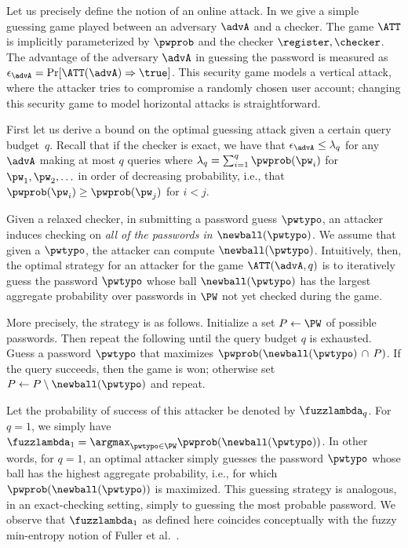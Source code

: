 Let us precisely define the notion of an online attack. In  we give a simple guessing game
played between an adversary $\advA$ and a checker. The game $\ATT$ is
implicitly parameterized by $\pwprob$ and the checker
$\register,\checker$. The advantage of the adversary $\advA$ in
guessing the password is measured as
$\epsilon_\advA = \Pr[\ATT(\advA)\Rightarrow\true]$.  This security
game models a vertical attack, where the attacker tries to compromise
a randomly chosen user account; changing this security game to model
horizontal attacks is straightforward.  

First let us derive a bound on the optimal guessing attack given a
certain query budget~$q$.  Recall that if the checker is exact, we
have that $\epsilon_\advA \le \lambda_q$ for any $\advA$ making at
most $q$ queries where $\lambda_q = \sum_{i=1}^q \pwprob(\pw_i)$ 
for $\pw_1, \pw_2, \ldots$ in order of decreasing probability, i.e.,
that $\pwprob(\pw_i) \ge \pwprob(\pw_j)$ for $i < j$.  

Given a relaxed checker, in submitting a password guess $\pwtypo$, an
attacker induces checking on {\em all of the passwords in
  $\newball(\pwtypo)$}. We assume that given a $\pwtypo$, the attacker
can compute $\newball(\pwtypo)$. Intuitively, then, the optimal
strategy for an attacker for the game $\ATT(\advA,q)$ is to
iteratively guess the password $\pwtypo$ whose ball
$\newball(\pwtypo)$ has the largest aggregate probability over
passwords in $\PW$ not yet checked during the game.

More precisely, the strategy is as follows. Initialize a set
$P \gets \PW$ of possible passwords. Then repeat the following until
the query budget $q$ is exhausted. Guess a password $\pwtypo$ that
maximizes $\pwprob(\newball(\pwtypo) \,\cap\, P)$. If the query
succeeds, then the game is won; otherwise set
$P \gets P \setminus \newball(\pwtypo)$ and repeat.

Let the probability of success of this attacker be denoted by
$\fuzzlambda_q$. For $q=1$, we simply have
$\fuzzlambda_1 = \argmax_{\pwtypo \in \PW}
\pwprob(\newball(\pwtypo))$.
In other words, for $q=1$, an optimal attacker simply guesses the
password $\pwtypo$ whose ball has the highest aggregate probability,
i.e., for which $\pwprob(\newball(\pwtypo))$ is maximized. This
guessing strategy is analogous, in an exact-checking setting, simply
to guessing the most probable password. We observe that
$\fuzzlambda_1$ as defined here coincides conceptually with the fuzzy
min-entropy notion of Fuller et al.~\cite{fuller2014fuzzy}.

